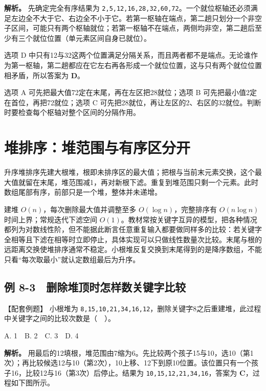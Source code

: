 \textbf{解析。} 先确定完全有序结果为 \texttt{2,\allowbreak{}5,\allowbreak{}12,\allowbreak{}16,\allowbreak{}28,\allowbreak{}32,\allowbreak{}60,\allowbreak{}72}。一个就位枢轴还必须满足左边全不大于它、右边全不小于它。若第一枢轴在端点，第二趟只划分一个非空子区间，可能只有两个枢轴就位；若第一枢轴不在端点，两侧均非空，第二趟后至少有三个就位位置（单元素区间自身已就位）。

选项 D 中只有12与32这两个位置满足分隔关系，而且两者都不是端点。无论谁作为第一枢轴，第二趟都应在它左右再各形成一个就位位置，这与只有两个就位位置相矛盾，所以答案为 \textbf{D}。

选项 A 可先把最大值72定在末尾，再在左区把28就位；选项 B 可先把最小值2定在首位，再把72就位；选项 C 可先把28就位，再让左区的2、右区的32就位。判断时要检查每个枢轴对整个区间的分隔作用。

\section{堆排序：堆范围与有序区分开}\label{DS08-07}

升序堆排序先建大根堆，根即未排序区的最大值；把根与当前末元素交换，这个最大值就留在末尾，堆范围减1，再对新根下滤。重复到堆范围只剩一个元素。此时数组尾部有序，前部只是一个堆，整体并未递增。

建堆 \(O(n)\)，每次删除最大值并调整至多 \(O(\log n)\)，完整排序有 \(O(n\log n)\) 时间上界；常规迭代下滤空间 \(O(1)\)。教材常按关键字互异的模型，把各种情况都列为对数线性阶，但不能据此断言任意重复输入都要做同样多的比较：若关键字全相等且下滤在相等时立即停止，具体实现可以只做线性数量次比较。末尾与根的远距离交换使堆排序通常不稳定。小根堆反复交换到末尾得到的是降序数组，不能只看``每次取最小''就认定数组最后为升序。

\subsection{例 8-3　删除堆顶时怎样数关键字比较}\label{DS08-ex3}

\begin{example}[配套案例]

【配套例题】 小根堆为 \texttt{8,\allowbreak{}15,\allowbreak{}10,\allowbreak{}21,\allowbreak{}34,\allowbreak{}16,\allowbreak{}12}，删除关键字8之后重建堆，此过程中关键字之间的比较次数是（　）。

A. 1　B. 2　C. 3　D. 4

\end{example}

\textbf{解析。} 用最后的12填根，堆范围由7缩为6。先比较两个孩子15与10，选10（第1次）；再比较候选12与10（第2次），10上移、12下到原10位置。该位置只有一个孩子16，比较12与16（第3次）后停止。结果为 \texttt{10,\allowbreak{}15,\allowbreak{}12,\allowbreak{}21,\allowbreak{}34,\allowbreak{}16}，答案为 \textbf{C}，过程如下图所示。

